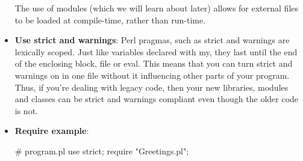 \documentclass{report}
\begin{document}
\begin{itemize}
            The use of modules (which we will learn about later) allows for external files to be loaded at compile-time, rather than run-time.
        \item \textbf{Use strict and warnings}: 
            Perl pragmas, such as strict and warnings are lexically scoped. Just like variables declared with my, they last until the end of the enclosing block, file or eval.
            \bigbreak \noindent 
            This means that you can turn strict and warnings on in one file without it influencing other parts of your program. Thus, if you’re dealing with legacy code, then your new libraries, modules and classes can be strict and warnings compliant even though the older code is not.
        \item \textbf{Require example}:
            \bigbreak \noindent 
            \bigbreak \noindent 
            \begin{perlcode}
                # program.pl
                use strict;
                require "Greetings.pl";


\end{perlcode}
\end{itemize}
\end{document}
